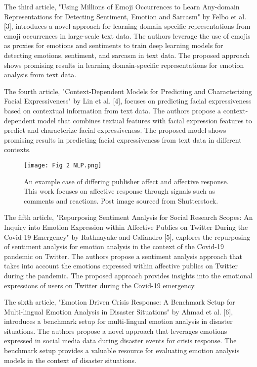 \documentclass[conference]{IEEEtran}
\begin{document}
The third article, "Using Millions of Emoji Occurrences to Learn Any-domain Representations for Detecting Sentiment, Emotion and Sarcasm" by Felbo et al. [3], introduces a novel approach for learning domain-specific representations from emoji occurrences in large-scale text data. The authors leverage the use of emojis as proxies for emotions and sentiments to train deep learning models for detecting emotions, sentiment, and sarcasm in text data. The proposed approach shows promising results in learning domain-specific representations for emotion analysis from text data.

The fourth article, "Context-Dependent Models for Predicting and Characterizing Facial Expressiveness" by Lin et al. [4], focuses on predicting facial expressiveness based on contextual information from text data. The authors propose a context-dependent model that combines textual features with facial expression features to predict and characterize facial expressiveness. The proposed model shows promising results in predicting facial expressiveness from text data in different contexts.
\begin{figure}[h]
    \centering
    \texttt{[image: Fig 2 NLP.png]}
    \caption{ An example case of differing publisher affect
and affective response. This work focuses on affective
response through signals such as comments and reactions. Post image sourced from Shutterstock.}
    \label{fig:1}
\end{figure}
The fifth article, "Repurposing Sentiment Analysis for Social Research Scopes: An Inquiry into Emotion Expression within Affective Publics on Twitter During the Covid-19 Emergency" by Rathnayake and Caliandro [5], explores the repurposing of sentiment analysis for emotion analysis in the context of the Covid-19 pandemic on Twitter. The authors propose a sentiment analysis approach that takes into account the emotions expressed within affective publics on Twitter during the pandemic. The proposed approach provides insights into the emotional expressions of users on Twitter during the Covid-19 emergency.

The sixth article, "Emotion Driven Crisis Response: A Benchmark Setup for Multi-lingual Emotion Analysis in Disaster Situations" by Ahmad et al. [6], introduces a benchmark setup for multi-lingual emotion analysis in disaster situations. The authors propose a novel approach that leverages emotions expressed in social media data during disaster events for crisis response. The benchmark setup provides a valuable resource for evaluating emotion analysis models in the context of disaster situations.
\end{document}

